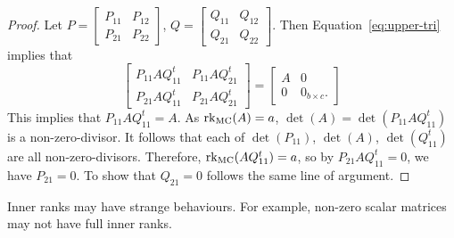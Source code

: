 \begin{proof}
	Let $P=\begin{bmatrix}
		P_{11} & P_{12}\\
		P_{21} & P_{22}
	\end{bmatrix}$, $Q=\begin{bmatrix}
		Q_{11} & Q_{12}\\
		Q_{21} & Q_{22}
	\end{bmatrix}$. Then Equation~\ref{eq:upper-tri} implies that 
	$$
	\begin{bmatrix}
		P_{11}AQ_{11}^t & P_{11}AQ_{21}^t\\
		P_{21}AQ_{11}^t & P_{21}AQ_{21}^t
	\end{bmatrix}
	=
	\begin{bmatrix}
		A & 0 \\
		0 & 0_{b\times c}.
	\end{bmatrix}
	$$
	This implies that
	$P_{11}AQ_{11}^t=A$. As $\mathrm{rk}_{\textrm{MC}}(A)=a$, $\det(A)=\det(P_{11}AQ_{11}^t)$ is a non-zero-divisor. It follows that each of $\det(P_{11})$, $\det(A)$, $\det(Q_{11}^t)$ are all non-zero-divisors. Therefore, $\mathrm{rk}_{\textrm{MC}}(AQ_{11}^t)=a$, so by $P_{21}AQ_{11}^t=0$, we have $P_{21}=0$. To show that $Q_{21}=0$ follows the same line of argument.
\end{proof}

Inner ranks may have strange behaviours. For example, non-zero scalar matrices may not have full inner ranks.

